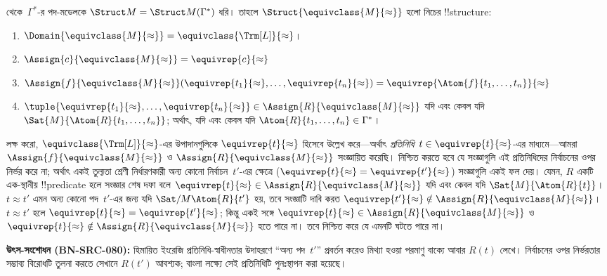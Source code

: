 \documentclass[../../../include/open-logic-section]{subfiles}
\begin{document}
\begin{defn}
 থেকে~$\Gamma^*$-র পদ-মডেলকে $\Struct M =
\Struct M(\Gamma^*)$ ধরি। তাহলে $\Struct{\equivclass{M}{\approx}}$ হলো
নিচের !!{structure}:
\begin{enumerate}
\item $\Domain{\equivclass{M}{\approx}} = \equivclass{\Trm[L]}{\approx}$।
\item $\Assign{c}{\equivclass{M}{\approx}} = \equivrep{c}{\approx}$
\item $\Assign{f}{\equivclass{M}{\approx}}(\equivrep{t_1}{\approx}, \dots,
  \equivrep{t_n}{\approx}) = \equivrep{\Atom{f}{t_1,\dots, t_n}}{\approx}$
\item $\tuple{\equivrep{t_1}{\approx}, \dots, \equivrep{t_n}{\approx}} \in
  \Assign{R}{\equivclass{M}{\approx}}$ যদি এবং কেবল যদি
  $\Sat{M}{\Atom{R}{t_1,\dots, t_n}}$; অর্থাৎ, যদি এবং কেবল যদি
  $\Atom{R}{t_1,\dots, t_n} \in \Gamma^*$।
\end{enumerate}
\end{defn}

\begin{explain}
লক্ষ করো, $\equivclass{\Trm[L]}{\approx}$-এর উপাদানগুলিকে
$\equivrep{t}{\approx}$ হিসেবে উল্লেখ করে—অর্থাৎ
\emph{প্রতিনিধি}~$t \in \equivrep{t}{\approx}$-এর মাধ্যমে—আমরা
$\Assign{f}{\equivclass{M}{\approx}}$ ও
$\Assign{R}{\equivclass{M}{\approx}}$ সংজ্ঞায়িত করেছি। নিশ্চিত করতে হবে
যে সংজ্ঞাগুলি এই প্রতিনিধিদের নির্বাচনের ওপর নির্ভর করে না; অর্থাৎ একই
তুল্যতা শ্রেণী নির্ধারণকারী অন্য কোনো নির্বাচন~$t'$-এর ক্ষেত্রে
($\equivrep{t}{\approx} = \equivrep{t'}{\approx}$) সংজ্ঞাগুলি একই ফল
দেয়। যেমন, $R$ একটি এক-স্থানীয় !!{predicate} হলে সংজ্ঞার শেষ দফা বলে
$\equivrep{t}{\approx} \in \Assign{R}{\equivclass{M}{\approx}}$ যদি এবং
কেবল যদি $\Sat{M}{\Atom{R}{t}}$। $t \approx t'$ এমন অন্য কোনো পদ~$t'$-এর
জন্য যদি $\Sat/{M}{\Atom{R}{t'}}$ হয়, তবে সংজ্ঞাটি দাবি করত
$\equivrep{t'}{\approx} \notin \Assign{R}{\equivclass{M}{\approx}}$।
$t \approx t'$ হলে $\equivrep{t}{\approx} =
\equivrep{t'}{\approx}$; কিন্তু একই সঙ্গে $\equivrep{t}{\approx} \in
\Assign{R}{\equivclass{M}{\approx}}$ ও $\equivrep{t}{\approx} \notin
\Assign{R}{\equivclass{M}{\approx}}$ হতে পারে না। তবে
 নিশ্চিত করে যে এমনটি ঘটতে পারে না।%
\par\smallskip\noindent\textnormal{\small\textbf{উৎস-সংশোধন (BN-SRC-080):} হিমায়িত ইংরেজি প্রতিনিধি-স্বাধীনতার উদাহরণে “অন্য পদ~$t'$” প্রবর্তন করেও মিথ্যা হওয়া পরমাণু বাক্যে আবার $R(t)$ লেখে। নির্বাচনের ওপর নির্ভরতার সম্ভাব্য বিরোধটি তুলনা করতে সেখানে $R(t')$ আবশ্যক; বাংলা লক্ষ্যে সেই প্রতিনিধিটি পুনঃস্থাপন করা হয়েছে।} %
\end{explain}
\end{document}

